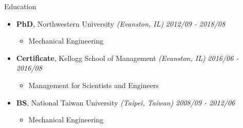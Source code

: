 \documentclass{resume} %
\begin{document}
\begin{rSection}{Education}
\begin{itemize}
	\item {\bf PhD}{, Northwestern University} \textit{(Evanston, IL)} \hfill {\em 2012/09 - 2018/08} 
	\vspace{-2mm}
	\begin{itemize}
		\setlength\itemsep{-2em}
		\item Mechanical Engineering
	\end{itemize}
	\item {\bf Certificate}{, Kellogg School of Management} \textit{(Evanston, IL)} \hfill {\em 2016/06 - 2016/08} 
	\vspace{-2mm}
	\begin{itemize}
		\setlength\itemsep{-2em}
		\item Management for Scientists and Engineers
	\end{itemize}
	\item {\bf BS}{, National Taiwan University} \textit{(Taipei, Taiwan)} \hfill {\em 2008/09 - 2012/06} 
	\vspace{-2mm}
	\begin{itemize}
		\setlength\itemsep{-2em}
		\item Mechanical Engineering
	\end{itemize}
\end{itemize}



\end{rSection}
\end{document}
